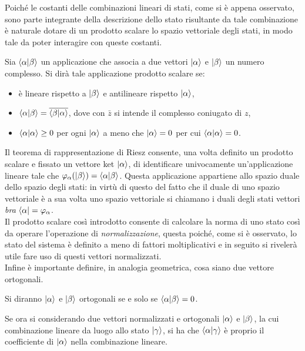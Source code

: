 Poiché le costanti delle combinazioni lineari di stati, come si è appena osservato, sono parte integrante della descrizione dello stato risultante da tale combinazione è naturale dotare di un prodotto scalare lo spazio vettoriale degli stati, in modo tale da poter interagire con queste costanti.
\begin{definition}
    Sia $\braket{\alpha |\beta}$ un applicazione che associa a due vettori $\ket{\alpha}$ e $\ket{\beta}$ un numero complesso. Si dirà tale applicazione prodotto scalare se:
    \begin{itemize}
        \item è lineare rispetto a $\ket{\beta}$ e antilineare rispetto $\ket{\alpha}$,
        \item $\braket{\alpha |\beta}=\overline{\braket{\beta |\alpha}}$, dove con $\bar z$ si intende il complesso coniugato di $z$,
        \item $\braket{\alpha |\alpha}\geq0$ per ogni $\ket{\alpha}$ a meno che $\ket{\alpha}=0$ per cui $\braket{\alpha |\alpha}=0$.
    \end{itemize} 
\end{definition}
Il teorema di rappresentazione di Riesz consente, una volta definito un prodotto scalare e fissato un vettore ket $\ket{\alpha}$, di identificare univocamente un'applicazione lineare tale che $\varphi_{\alpha}(\ket{\beta})=\braket{\alpha |\beta}$. Questa applicazione appartiene allo spazio duale dello spazio degli stati: in virtù di questo del fatto che il duale di uno spazio vettoriale è a sua volta uno spazio vettoriale si chiamano i duali degli stati vettori \emph{bra} $\bra{\alpha}=\varphi_{\alpha}$.\\
Il prodotto scalare così introdotto consente di calcolare la norma di uno stato così da operare l'operazione di \emph{normalizzazione}, questa poiché, come si è osservato, lo stato del sistema è definito a meno di fattori moltiplicativi e in seguito si rivelerà utile fare uso di questi vettori normalizzati.\\
Infine è importante definire, in analogia geometrica, cosa siano due vettore ortogonali.
\begin{definition}
    Si diranno $\ket{\alpha}$ e $\ket{\beta}$ ortogonali se e solo se $\braket{\alpha |\beta}=0$.
\end{definition}
Se ora si considerando due vettori normalizzati e ortogonali $\ket{\alpha}$ e $\ket{\beta}$, la cui combinazione lineare da luogo allo stato $\ket{\gamma}$, si ha che $\braket{\alpha|\gamma}$ è proprio il coefficiente di $\ket{\alpha}$ nella combinazione lineare.
